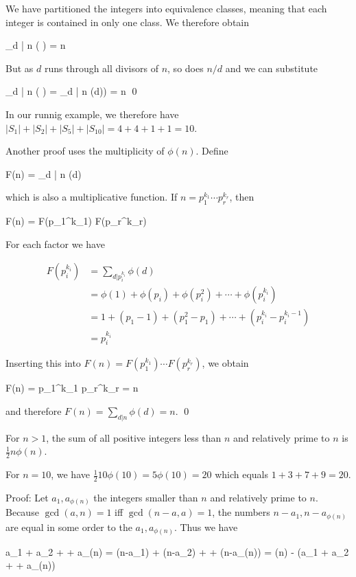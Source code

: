 We have partitioned the integers into equivalence classes, meaning that each integer is contained in only one class. We therefore obtain

\bee
\sum_{d | n} \phi \left(  \right) = n
\eee

But as $d$ runs through all divisors of $n$, so does $n/d$ and we can substitute

\bee
\sum_{d | n} \phi \left(  \right) = \sum_{d | n} \phi(d)) = n \qed
\eee

In our runnig example, we therefore have $|S_1| + |S_2| + |S_5| + |S_{10}| = 4 + 4 + 1 + 1 = 10$.

Another proof uses the multiplicity of $\phi(n)$. Define

\bee
F(n) = \sum_{d | n} \phi(d)
\eee

which is also a multiplicative function. If $n = p_1^{k_1} \cdots p_r^{k_r}$, then

\bee
F(n) = F(p_1^{k_1}) \cdots F(p_r^{k_r})
\eee

For each factor we have

\begin{align*}
  F(p_i^{k_i}) &= \sum_{d | p_i^{k_i} } \phi(d) \\
  &= \phi(1) + \phi(p_i) + \phi(p_i^2) + \cdots + \phi(p_i^{k_i}) \\
  &= 1 + (p_1 - 1)+  (p_1^2 - p_1) + \cdots + (p_i^{k_i} - p_i^{k_i-1}) \\
  &= p_i^{k_i}
\end{align*}

Inserting this into $F(n) = F(p_1^{k_1}) \cdots F(p_r^{k_r})$, we obtain

\bee
F(n) = p_1^{k_1} \cdots p_r^{k_r} = n
\eee

and therefore $F(n) = \sum_{d | n} \phi(d) = n$. \qed


\begin{theorem}
  For $n>1$, the sum of all positive integers less than $n$ and relatively prime to $n$ is $\frac{1}{2}n\phi(n)$.
\end{theorem}

For $n = 10$, we have $\frac{1}{2}10 \phi(10) = 5 \phi(10) = 20$ which equals $1 + 3 + 7 + 9 = 20$.

Proof: Let $a_1, a_{\phi(n)}$ the integers smaller than $n$ and relatively prime to $n$. Because $\gcd(a,n) = 1$ iff $\gcd(n-a,a) = 1$, the numbers $n - a_1, n - a_{\phi(n)}$ are equal in some order to the $a_1, a_{\phi(n)}$. Thus we have

\bee
a_1 + a_2 + \cdots + a_{\phi(n)} = (n-a_1) + (n-a_2) + \cdots + (n-a_{\phi(n)}) = \phi(n) - (a_1 + a_2 + \cdots + a_{\phi(n)})
\eee

